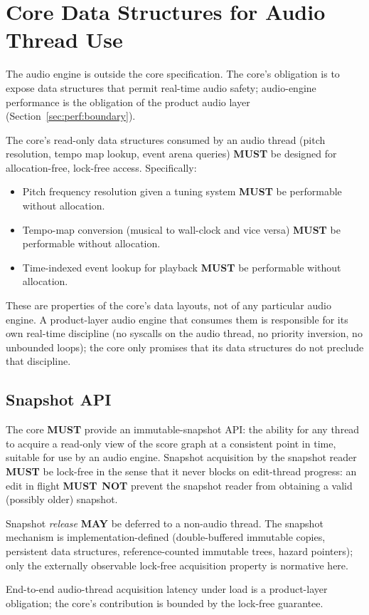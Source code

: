 \documentclass[11pt,letterpaper]{report}
\newcounter{requirement}[chapter]
\newcommand{\MUST}{\textbf{MUST}}
\newcommand{\MUSTNOT}{\textbf{MUST}\nobreak\ \textbf{NOT}}
\newcommand{\MAY}{\textbf{MAY}}
\begin{document}
\section{Core Data Structures for Audio Thread Use}
\label{sec:perf:audio}

The audio engine is outside the core specification. The core's
obligation is to expose data structures that permit real-time
audio safety; audio-engine performance is the obligation of the
product audio layer (Section~\ref{sec:perf:boundary}).

\begin{requirement}
  \label{req:perf:audio-thread-data-access}
  The core's read-only data structures consumed by an audio
  thread (pitch resolution, tempo map lookup, event arena
  queries) \MUST{} be designed for allocation-free, lock-free
  access. Specifically:

  \begin{itemize}
    \item Pitch frequency resolution given a tuning system \MUST{}
      be performable without allocation.
    \item Tempo-map conversion (musical to wall-clock and vice
      versa) \MUST{} be performable without allocation.
    \item Time-indexed event lookup for playback \MUST{} be
      performable without allocation.
  \end{itemize}

  These are properties of the core's data layouts, not of any
  particular audio engine. A product-layer audio engine that
  consumes them is responsible for its own real-time discipline
  (no syscalls on the audio thread, no priority inversion, no
  unbounded loops); the core only promises that its data
  structures do not preclude that discipline.
\end{requirement}

\subsection{Snapshot API}

\begin{requirement}
  \label{req:perf:lock-free-snapshots}
  The core \MUST{} provide an immutable-snapshot API: the
  ability for any thread to acquire a read-only view of the
  score graph at a consistent point in time, suitable for use
  by an audio engine. Snapshot acquisition by the snapshot
  reader \MUST{} be lock-free in the sense that it never blocks
  on edit-thread progress: an edit in flight \MUSTNOT{} prevent
  the snapshot reader from obtaining a valid (possibly older)
  snapshot.

  Snapshot \emph{release} \MAY{} be deferred to a non-audio
  thread. The snapshot mechanism is implementation-defined
  (double-buffered immutable copies, persistent data structures,
  reference-counted immutable trees, hazard pointers); only the
  externally observable lock-free acquisition property is
  normative here.

  End-to-end audio-thread acquisition latency under load is a
  product-layer obligation; the core's contribution is bounded
  by the lock-free guarantee.
\end{requirement}
\end{document}
